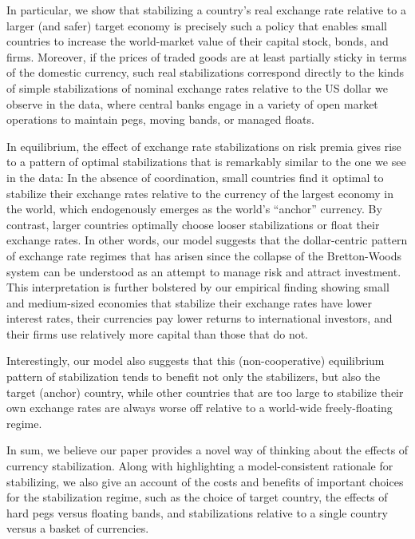 \documentclass[12pt,letter]{article}
\theoremstyle{break} \theorembodyfont{\normalfont\itshape}
\theoremstyle{break}
\theoremstyle{break} \theorembodyfont{\normalfont\itshape}
\theoremstyle{break} \theorembodyfont{\normalfont\itshape}
\begin{document}
In particular, we show that stabilizing a country's real exchange rate
relative to a larger (and safer) target economy is precisely such a
policy that enables small countries to increase the world-market value
of their capital stock, bonds, and firms. Moreover, if the prices of
traded goods are at least partially sticky in terms of the domestic
currency, such real stabilizations correspond directly to the kinds of
simple stabilizations of nominal exchange rates relative to the US
dollar we observe in the data, where central banks engage in a variety
of open market operations to maintain pegs, moving bands, or managed
floats.

In equilibrium, the effect of exchange rate stabilizations on risk
premia gives rise to a pattern of optimal stabilizations that is
remarkably similar to the one we see in the data: In the absence of
coordination, small countries find it optimal to stabilize their
exchange rates relative to the currency of the largest economy in the
world, which endogenously emerges as the world's ``anchor'' currency.
By contrast, larger countries optimally choose looser stabilizations
or float their exchange rates. In other words, our model suggests that
the dollar-centric pattern of exchange rate regimes that has arisen
since the collapse of the Bretton-Woods system can be understood as an
attempt to manage risk and attract investment. This interpretation is
further bolstered by our empirical finding showing small and
medium-sized economies that stabilize their exchange rates have lower
interest rates, their currencies pay lower returns to international
investors, and their firms use relatively more capital than those that
do not.


Interestingly, our model also suggests that this (non-cooperative)
equilibrium pattern of stabilization tends to benefit not only the
stabilizers, but also the target (anchor) country, while other
countries that are too large to stabilize their own exchange rates are
always worse off relative to a world-wide freely-floating regime.

In sum, we believe our paper provides a novel way of thinking about
the effects of currency stabilization. Along with highlighting a
model-consistent rationale for stabilizing, we also give an account of
the costs and benefits of important choices for the stabilization
regime, such as the choice of target country, the effects of hard pegs
versus floating bands, and stabilizations relative to a single country
versus a basket of currencies.
\end{document}
